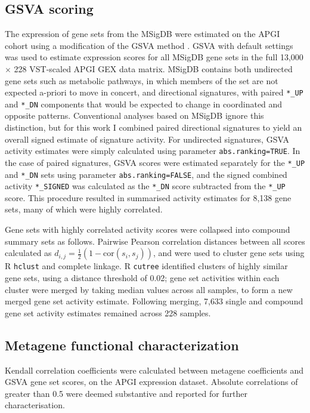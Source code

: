 \documentclass[dissertation.tex]{subfiles}
\begin{document}
\subsection{\acrshort{GSVA} scoring}
The expression of gene sets from the \gls{MSigDB} \cite{Subramanian2005} were estimated on the \gls{APGI} cohort using a modification of the \gls{GSVA} method \cite{Hanzelmann2013}.  \gls{GSVA} with default settings was used to estimate expression scores for all \gls{MSigDB} gene sets in the full 13,000 $\times$ 228 \gls{VST}-scaled \gls{APGI} \gls{GEX} data matrix.  \gls{MSigDB} contains both undirected gene sets such as metabolic pathways, in which members of the set are not expected a-priori to move in concert, and directional signatures, with paired \texttt{*\_UP} and \texttt{*\_DN} components that would be expected to change in coordinated and opposite patterns.  Conventional analyses based on \gls{MSigDB} ignore this distinction, but for this work I combined paired directional signatures to yield an overall signed estimate of signature activity.  For undirected signatures, \gls{GSVA} activity estimates were simply calculated using parameter \texttt{abs.ranking=TRUE}.  In the case of paired signatures, \gls{GSVA} scores were estimated separately for the \texttt{*\_UP} and \texttt{*\_DN} sets using parameter \texttt{abs.ranking=FALSE}, and the signed combined activity \texttt{*\_SIGNED} was calculated as the \texttt{*\_DN} score subtracted from the \texttt{*\_UP} score.  This procedure resulted in summarised activity estimates for 8,138 gene sets, many of which were highly correlated.

Gene sets with highly correlated activity scores were collapsed into compound summary sets as follows.  Pairwise Pearson correlation distances between all scores calculated as $d_{i,j} = \frac{1}{2}(1 - \text{cor}(s_i, s_j))$, and were used to cluster gene sets using R \texttt{hclust} and complete linkage.  R \texttt{cutree} identified clusters of highly similar gene sets, using a distance threshold of 0.02; gene set activities within each cluster were merged by taking median values across all samples, to form a new merged gene set activity estimate.  Following merging, 7,633 single and compound gene set activity estimates remained across 228 samples.

\subsection{Metagene functional characterization}
Kendall correlation coefficients were calculated between metagene coefficients and \gls{GSVA} gene set scores, on the \gls{APGI} expression dataset.  Absolute correlations of greater than 0.5 were deemed substantive and reported for further characterisation.
\end{document}
